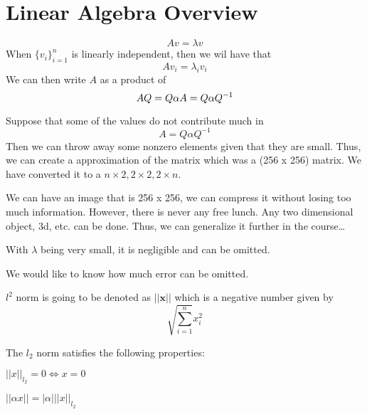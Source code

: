 \chapter{Linear Algebra Overview}

\begin{remark}
  \[
    Av = \lambda v
  \]
  When \(\{ v_i \}_{i=1}^{n} \) is linearly independent, then we wil  have 
  that
  \[
    Av_i = \lambda_i v_i
  \]    
  We can then write \(A\) as a product of 
  \[
    AQ = Q \alpha \\
    A = Q \alpha Q^{-1}
  \] 
\end{remark}

\begin{remark}
  Suppose that some of the values do not contribute much in
  \[
    A = Q \alpha  Q^{-1}
  \]
  Then we can throw away some nonzero elements given that they are small. 
  Thus, we can create a approximation of the matrix which was a (256 x 256) matrix. 
  We have converted it to a \(n \times 2 , 2\times 2 , 2\times n\). 

  \begin{eg}
    We can have an image that is 256 x 256, we can compress it without losing too much information. 
    However, there is never any free lunch. Any two dimensional object, 3d, etc. can 
    be done. Thus, we can generalize it further in the course\dots

    With \(\lambda \) being very small, it is negligible and can be omitted.  
  \end{eg}
\end{remark}

We would like to know how much error can be omitted. 

\begin{definition}
  \(l^{2}  \) norm is going to be denoted as \(||\mathbf{x}||\) which is a 
  negative number given by 
  \[
    \sqrt{\sum_{i=1}^{n}} x_i ^{2}  
  \] 
\end{definition}

\begin{theorem}
  The \(l_2\) norm satisfies the following properties:
  \begin{list}{}{\leftmargin=1em}
    \item \(||x||_{l_2}= 0 \iff x = 0 \)
    \item \(||\alpha x|| = |\alpha|||x||_{l_2}\)
  \end{list}
\end{theorem}